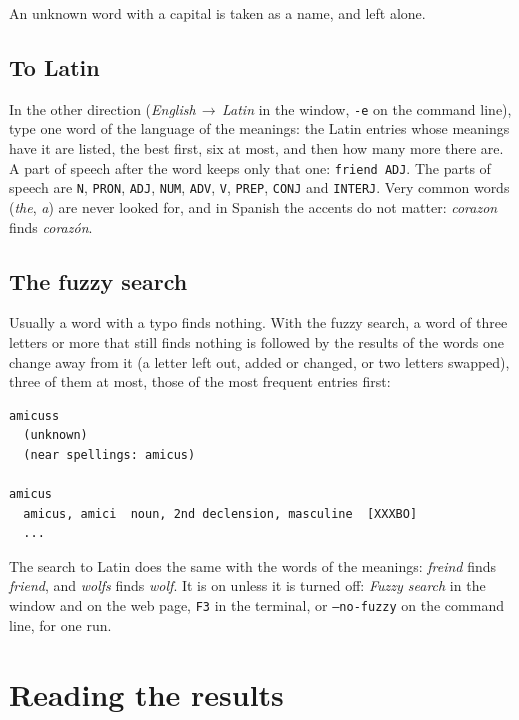\documentclass[12pt,
              article,
              oneside
              ]{memoir}
\newcommand*{\menu}[1]{\textit{#1}}
\newcommand*{\key}[1]{\texttt{#1}}
\begin{document}
\noindent{}%
An unknown word with a capital is taken as a name, and left alone.

\subsection{To Latin}

%
In the other direction (\menu{English\,$\rightarrow$\,Latin} in the
window, \texttt{-e} on the command line), type one word of the language of
the meanings: the Latin entries whose meanings have it are listed, the
best first, six at most, and then how many more there are. A part of
speech after the word keeps only that one: \texttt{friend ADJ}. The parts
of speech are \texttt{N}, \texttt{PRON}, \texttt{ADJ}, \texttt{NUM},
\texttt{ADV}, \texttt{V}, \texttt{PREP}, \texttt{CONJ} and
\texttt{INTERJ}. Very common words (\textit{the}, \textit{a}) are never
looked for, and in Spanish the accents do not matter: \textit{corazon}
finds \textit{corazón}.

\subsection{The fuzzy search}
\label{sec:fuzzy}

%
Usually a word with a typo finds nothing. With the fuzzy search, a word of
three letters or more that still finds nothing is followed by the results
of the words one change away from it (a letter left out, added or
changed, or two letters swapped), three of them at most, those of the
most frequent entries first:

\begin{verbatim}
amicuss
  (unknown)
  (near spellings: amicus)

amicus
  amicus, amici  noun, 2nd declension, masculine  [XXXBO]
  ...
\end{verbatim}

\noindent
The search to Latin does the same with the words of the meanings:
\textit{freind} finds \textit{friend}, and \textit{wolfs} finds
\textit{wolf}. It is on unless it is turned off: \menu{Fuzzy search} in
the window and on the web page, \key{F3} in the terminal, or
\texttt{--no-fuzzy} on the command line, for one run.

\section{Reading the results}
\label{sec:results}
\end{document}

